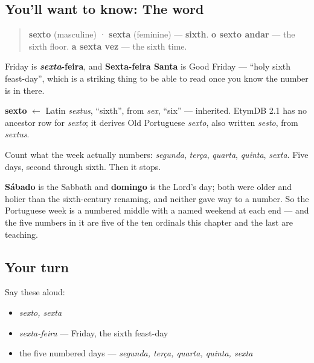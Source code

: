 \subsection*{You'll want to know: The word}
\begin{quote}
\textbf{sexto} (masculine) · \textbf{sexta} (feminine) — \textbf{sixth}. \textbf{o sexto andar} — the sixth floor. \textbf{a sexta vez} — the sixth time.
\end{quote}

Friday is \textbf{\emph{sexta}-feira}, and \textbf{Sexta-feira Santa} is Good Friday — \textquotedblleft{}holy sixth feast-day\textquotedblright{}, which is a striking thing to be able to read once you know the number is in there.

\begin{cousinweb}
\textbf{sexto} $\leftarrow$ Latin \emph{sextus}, \textquotedblleft{}sixth\textquotedblright{}, from \emph{sex}, \textquotedblleft{}six\textquotedblright{} — inherited. EtymDB 2.1 has no ancestor row for \emph{sexto}; it derives Old Portuguese \emph{sexto}, also written \emph{sesto}, from \emph{sextus}.
\end{cousinweb}

\begin{culture}
Count what the week actually numbers: \emph{segunda}, \emph{terça}, \emph{quarta}, \emph{quinta}, \emph{sexta}. Five days, second through sixth. Then it stops.

\textbf{Sábado} is the Sabbath and \textbf{domingo} is the Lord's day; both were older and holier than the sixth-century renaming, and neither gave way to a number. So the Portuguese week is a numbered middle with a named weekend at each end — and the five numbers in it are five of the ten ordinals this chapter and the last are teaching.
\end{culture}

\subsection*{Your turn}
Say these aloud:

\begin{itemize}
\raggedright
  \item \emph{sexto, sexta}
  \item \emph{sexta-feira} — Friday, the sixth feast-day
  \item the five numbered days — \emph{segunda, terça, quarta, quinta, sexta}
\end{itemize}

